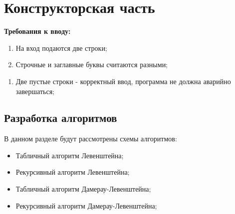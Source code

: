 \documentclass[a4paper, 12pt]{article}
\begin{document}
\section{Конструкторская часть}
\begin{flushleft}
	{\bf Требования к вводу: }
	\begin{enumerate}
		\item На вход подаются две строки;
		\item Строчные и заглавные буквы считаются разными;
	\end{enumerate}

	\begin{enumerate}
		\item Две пустые строки - корректный ввод, программа не должна аварийно завершаться;
	\end{enumerate}
	\subsection{Разработка алгоритмов}
	В данном разделе будут рассмотрены схемы алгоритмов:
	\begin{itemize}
		\item Табличный алгоритм Левенштейна;
		\item Рекурсивный алгоритм Левенштейна;
		\item Табличный алгоритм Дамерау-Левенштейна;
		\item Рекурсивный алгоритм Дамерау-Левенштейна;
	\end{itemize}
	\newpage
	\begin{figure}[h]

\end{figure}
\end{flushleft}
\end{document}
